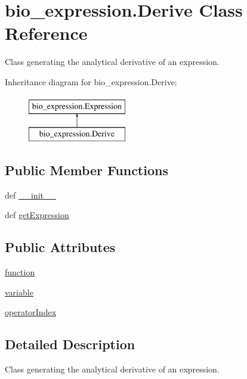 \hypertarget{classbio__expression_1_1_derive}{\section{bio\+\_\+expression.\+Derive Class Reference}
\label{classbio__expression_1_1_derive}
}


Class generating the analytical derivative of an expression.  


Inheritance diagram for bio\+\_\+expression.\+Derive\+:\begin{figure}[H]
\begin{center}
\leavevmode
\includegraphics[height=2.000000cm]{db/d4e/classbio__expression_1_1_derive}
\end{center}
\end{figure}
\subsection*{Public Member Functions}
\begin{DoxyCompactItemize}
\item 
def \hyperlink{classbio__expression_1_1_derive_aec4593b78894c252344208f528a7b2d5}{\+\_\+\+\_\+init\+\_\+\+\_\+}
\item 
def \hyperlink{classbio__expression_1_1_derive_afc6d7ed5eff276e094f3b861a3c85d3e}{get\+Expression}
\end{DoxyCompactItemize}
\subsection*{Public Attributes}
\begin{DoxyCompactItemize}
\item 
\hyperlink{classbio__expression_1_1_derive_a1a2eee35fb9f6d59bcd3566d3ed19c83}{function}
\item 
\hyperlink{classbio__expression_1_1_derive_a341cac7e9fa0b5aec5de04f9a78b6f6b}{variable}
\item 
\hyperlink{classbio__expression_1_1_derive_acc082adfb3029c3237009c0f47502918}{operator\+Index}
\end{DoxyCompactItemize}


\subsection{Detailed Description}
Class generating the analytical derivative of an expression. 

